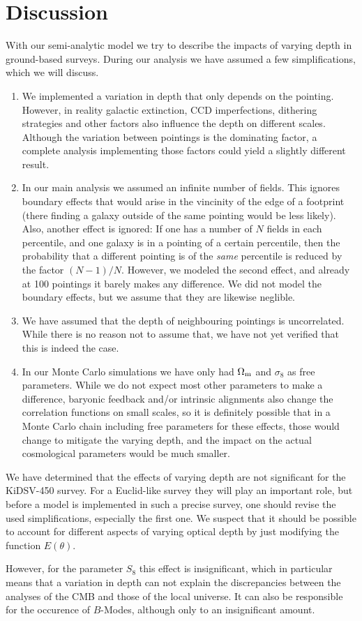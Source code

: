 \section{Discussion}
\label{sec:discussion}
With our semi-analytic model we try to describe the impacts of varying depth in ground-based surveys. During our analysis we have assumed a few simplifications, which we will discuss.
\begin{enumerate}
\item We implemented a variation in depth that only depends on the pointing. However, in reality galactic extinction, CCD imperfections, dithering strategies and other factors also influence the depth on different scales. Although the variation between pointings is the dominating factor, a complete analysis implementing those factors could yield a slightly different result.
\item In our main analysis we assumed an infinite number of fields. This ignores boundary effects that would arise in the vincinity of the edge of a footprint (there finding a galaxy outside of the same pointing would be less likely). Also, another effect is ignored: If one has a number of $N$ fields in each percentile, and one galaxy is in a pointing of a certain percentile, then the probability that a different pointing is of the \emph{same} percentile is reduced by the factor $(N-1)/N$. However, we modeled the second effect, and already at 100 pointings it barely makes any difference. We did not model the boundary effects, but we assume that they are likewise neglible. 
\item We have assumed that the depth of neighbouring pointings is uncorrelated. While there is no reason not to assume that, we have not yet verified that this is indeed the case.
\item In our Monte Carlo simulations we have only had $\Omega_{\rm m}$ and $\sigma_8$ as free parameters. While we do not expect most other parameters to make a difference, baryonic feedback and/or intrinsic alignments also change the correlation functions on small scales, so it is definitely possible that in a Monte Carlo chain including free parameters for these effects, those would change to mitigate the varying depth, and the impact on the actual cosmological parameters would be much smaller.
\end{enumerate}
We have determined that the effects of varying depth are not significant for the KiDSV-450 survey. For a Euclid-like survey they will play an important role, but before a model is implemented in such a precise survey, one should revise the used simplifications, especially the first one. We suspect that it should be possible to account for different aspects of varying optical depth by just modifying the function $E(\theta)$.

However, for the parameter $S_8$ this effect is insignificant, which in particular means that a variation in depth can not explain the discrepancies between the analyses of the CMB and those of the local universe. It can also be responsible for the occurence of $B$-Modes, although only to an insignificant amount.
